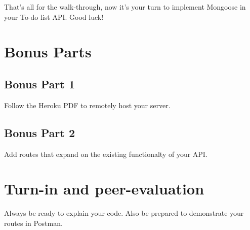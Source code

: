 \documentclass{42-en}
\begin{document}
    That's all for the walk-through, now it's your turn to implement Mongoose in your To-do list API. Good luck!

        
        \newpage
					
					
\chapter{Bonus Parts}

\section{Bonus Part 1}
Follow the Heroku PDF to remotely host your server.

\section{Bonus Part 2}
Add routes that expand on the existing functionalty of your API.

\chapter{Turn-in and peer-evaluation}

Always be ready to explain your code. Also be prepared to demonstrate your routes in Postman.

\end{document}
